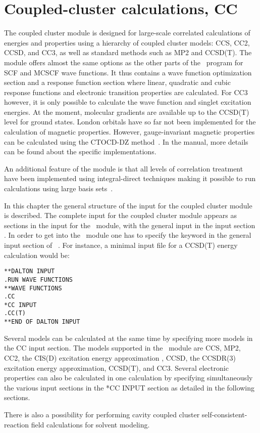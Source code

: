 \chapter{Coupled-cluster calculations, CC}\label{ch:CC}

The coupled cluster module {\cc} is designed for large-scale
correlated calculations of energies and properties using a
hierarchy of coupled cluster models: CCS, CC2, CCSD, and CC3, as well as standard methods such as MP2 and CCSD(T).
The module offers almost the same options as the other
parts of the \dalton\ program for SCF and MCSCF wave functions.
It thus contains a wave function optimization section and 
a response function section
where linear, quadratic and cubic response functions and electronic
transition properties are calculated.
For CC3 however, it is only possible to calculate the wave function and 
singlet excitation energies.
At the moment, molecular gradients are available 
up to the CCSD(T) level for ground states.  
London orbitals have so far not been implemented 
for the calculation of magnetic
properties.
However, gauge-invariant magnetic properties can be calculated using the
CTOCD-DZ method~\cite{ctocd,pccpcctocd}.
In the manual, more details can be found about the specific implementations.

An additional feature of the module is that all levels of correlation
treatment have been implemented using integral-direct techniques making
it possible to run calculations using large basis
sets~\cite{directCC}.

In this chapter the general structure of the input for the
coupled cluster module is described.
The complete input for the coupled cluster module appears as
sections in the input for the \sir\ module, with the general
input in the input section . In order to get into the \cc\ module
one has to specify the  keyword in the general input
section of \sir\ . For instance, a minimal
input file for a CCSD(T) energy calculation would be:
\begin{verbatim}
**DALTON INPUT
.RUN WAVE FUNCTIONS
**WAVE FUNCTIONS
.CC
*CC INPUT
.CC(T)
**END OF DALTON INPUT
\end{verbatim}

Several models can be calculated at the same time by specifying more models
in the CC input section. 
The models supported in the \cc\ module are 
CCS\cite{Christiansen:CPL243},
MP2\cite{Moller34},
CC2\cite{Christiansen:CPL243},
the CIS(D) excitation energy approximation \cite{Head-Gordon:94},
CCSD\cite{Purvis82},
the CCSDR(3) excitation energy approximation\cite{Christiansen:PERTURBATIVE_TRIPLES}, 
CCSD(T)\cite{Raghavachari89}, and CC3\cite{Christiansen:JCP103,Koch:JCP106}.
Several electronic properties can also 
be calculated in one calculation by specifying simultaneously 
the various input sections in the *CC INPUT section
as detailed in the following sections.

There is also a possibility for performing cavity coupled cluster
self-consistent-reaction field calculations for solvent modeling.
